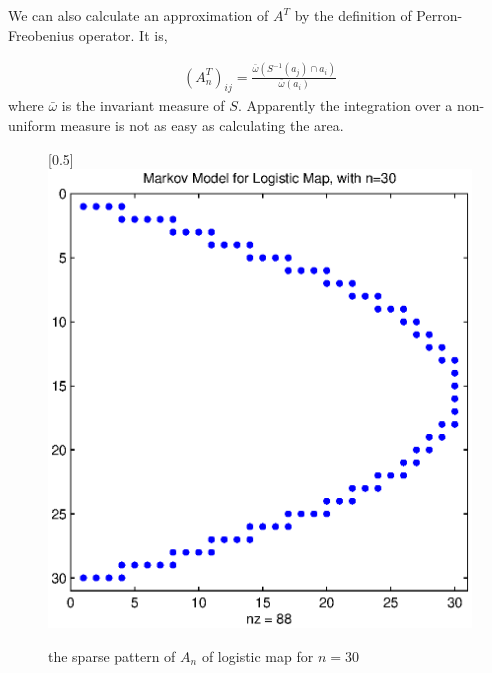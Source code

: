 \documentclass{article}
\begin{document}
We can also calculate an approximation of $A^T$ by the definition of Perron-Freobenius operator. It is,

  \begin{eqnarray}
(A_n^T)_{ij} =  \frac{\bar{\omega}(S^{-1}(a_j)\cap a_i)}{\bar{\omega}(a_i)} 
 \end{eqnarray}
where $\bar{\omega}$ is the invariant measure of $S$. Apparently the integration over a non-uniform measure is not as easy as calculating the area.   

\begin{figure}

\caption{\label{logisticmapAn} the sparse pattern of $A_n$ of logistic map for $n = 30$}
\centerline{\scalebox{0.5}[0.5]{\includegraphics{logisticmapA}}}
\end{figure}
\end{document}
